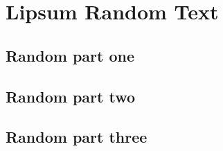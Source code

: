 \chapter{Lipsum Random Text}
\section{Random part one}
\lipsum[1-15]
\section{Random part two}
\lipsum[1-15]
\section{Random part three}
\lipsum[1-15]